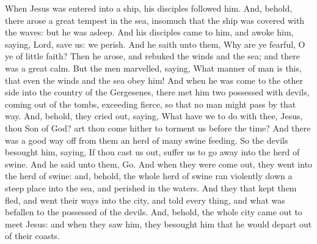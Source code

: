 \vspace{-1ex}
 When Jesus was entered into a ship, his disciples followed him. And, behold, there arose a great tempest in the sea, insomuch that the ship was covered with the waves: but he was asleep. And his disciples came to him, and awoke him, saying, Lord, save us: we perish. And he saith unto them, Why are ye fearful, O ye of little faith? Then he arose, and rebuked the winds and the sea; and there was a great calm. But the men marvelled, saying, What manner of man is this, that even the winds and the sea obey him! And when he was come to the other side into the country of the Gergesenes, there met him two possessed with devils, coming out of the tombs, exceeding fierce, so that no man might pass by that way. And, behold, they cried out, saying, What have we to do with thee, Jesus, thou Son of God? art thou come hither to torment us before the time? And there was a good way off from them an herd of many swine feeding. So the devils besought him, saying, If thou cast us out, suffer us to go away into the herd of swine. And he said unto them, Go. And when they were come out, they went into the herd of swine: and, behold, the whole herd of swine ran violently down a steep place into the sea, and perished in the waters. And they that kept them fled, and went their ways into the city, and told every thing, and what was befallen to the possessed of the devils. And, behold, the whole city came out to meet Jesus: and when they saw him, they besought him that he would depart out of their coasts.

